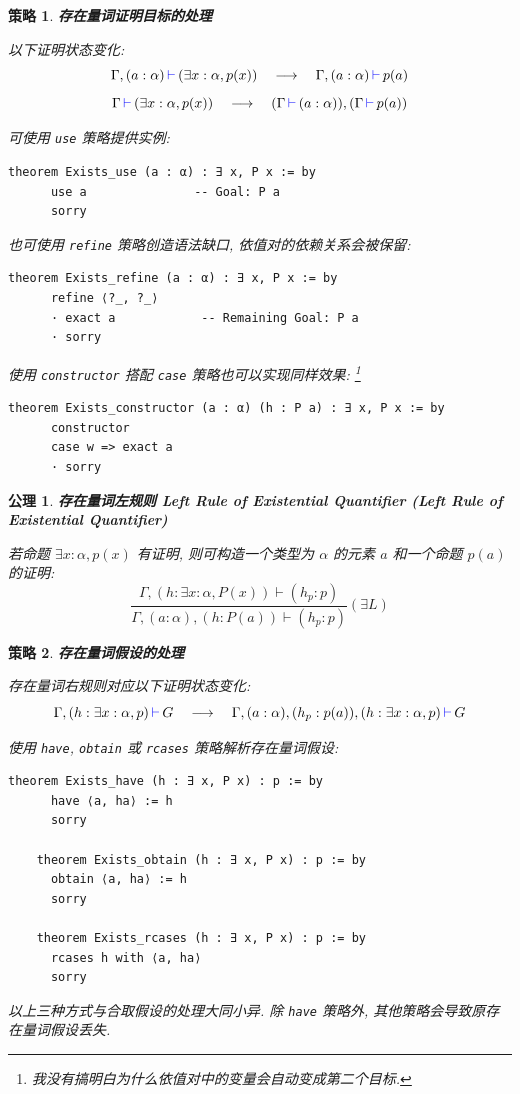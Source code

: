 \documentclass[UTF8]{ctexart}
\DeclareMathOperator{\0}{\mathbf{0}}                    %
\newcommand{\<}{\langle}
\renewcommand{\>}{\rangle}                              %
\newenvironment{thm_box}{
    \begin{tcolorbox}[enhanced, colback=thm_blue2, boxrule=0pt, frame hidden,
        borderline west={0.7mm}{0.1mm}{thm_blue1},breakable]
    }
    {\end{tcolorbox}}
\newenvironment{axm_box}{
    \begin{tcolorbox}[enhanced, colback=axm_yellow2, boxrule=0pt, frame hidden,
        borderline west={0.7mm}{0.1mm}{axm_yellow1},breakable]
    }
    {\end{tcolorbox}}
\theoremstyle{MyStyle} %
\newtheorem{axiom}{公理}[section]
\newenvironment{axm}[2]
{
    \begin{axm_box}
        \begin{axiom}
            \textbf{#1
                \ifx\relax#2\relax\else %
                    (#2) %
                \fi}
            \newline
}
{
        \end{axiom}
    \end{axm_box}
}
\newtheorem{mytactic}{策略}
\newenvironment{tactic}[1]
{
    \begin{thm_box}
        \begin{mytactic}
            \textbf{#1}
            \newline
}
{
        \end{mytactic}
    \end{thm_box}
}
\newcommand*{\lean}[1]{\texttt{\color{blue}#1}}
\newcommand{\Goal}{\texttt{\,\color{leanblue}\ensuremath{\vdash}\,}}
\begin{document}
        \begin{tactic}
            {存在量词证明目标的处理}
            以下证明状态变化: 
            \[\Gamma, (a : \alpha)\Goal(\exists x : \alpha, p(x))\quad\longrightarrow\quad\Gamma, (a : \alpha)\Goal p(a)\]
            \[\Gamma\Goal(\exists x : \alpha, p(x))\quad\longrightarrow\quad(\Gamma\Goal(a : \alpha)), (\Gamma\Goal p(a))\]
            
            可使用 \lean{use} 策略提供实例: 
            \begin{lstlisting}[style=lean]
    theorem Exists_use (a : α) : ∃ x, P x := by
      use a               -- Goal: P a
      sorry
            \end{lstlisting}
            
            也可使用 \lean{refine} 策略创造语法缺口, 依值对的依赖关系会被保留: 
            \begin{lstlisting}[style=lean]
    theorem Exists_refine (a : α) : ∃ x, P x := by
      refine ⟨?_, ?_⟩
      · exact a            -- Remaining Goal: P a
      · sorry
            \end{lstlisting}

            使用 \lean{constructor} 搭配 \lean{case} 策略也可以实现同样效果: \footnote{我没有搞明白为什么依值对中的变量会自动变成第二个目标. }
            \begin{lstlisting}[style=lean]
    theorem Exists_constructor (a : α) (h : P a) : ∃ x, P x := by
      constructor
      case w => exact a
      · sorry
            \end{lstlisting}
        \end{tactic}

        \begin{axm}
            {存在量词左规则}
            {Left Rule of Existential Quantifier}
            若命题 $\exists x : \alpha, p(x)$ 有证明, 则可构造一个类型为 $\alpha$ 的元素 $a$ 和一个命题 $p(a)$ 的证明: 
            \[\frac{\Gamma, (h : \exists x : \alpha, P(x))\vdash(h_p:p)}{\Gamma, (a : \alpha),(h : P(a))\vdash(h_p:p)}(\exists L)\]
        \end{axm}

        \begin{tactic}
            {存在量词假设的处理}
            存在量词右规则对应以下证明状态变化: 
            \[\Gamma, (h : \exists x : \alpha, p)\Goal G\quad\longrightarrow\quad\Gamma, (a : \alpha), (h_p : p(a)), (h : \exists x : \alpha, p)\Goal G\]

            使用 \lean{have}, \lean{obtain} 或 \lean{rcases} 策略解析存在量词假设: 
            \begin{lstlisting}[style=lean]
    theorem Exists_have (h : ∃ x, P x) : p := by
      have ⟨a, ha⟩ := h
      sorry

    theorem Exists_obtain (h : ∃ x, P x) : p := by
      obtain ⟨a, ha⟩ := h
      sorry

    theorem Exists_rcases (h : ∃ x, P x) : p := by
      rcases h with ⟨a, ha⟩
      sorry
            \end{lstlisting}

            以上三种方式与合取假设的处理大同小异. 除 \lean{have} 策略外, 其他策略会导致原存在量词假设丢失. 
        \end{tactic}
\end{document}
